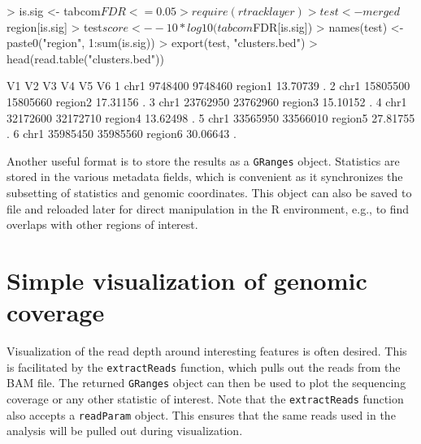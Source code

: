 \documentclass[12pt]{report}
\renewenvironment{Schunk}{\vspace{0pt}}{\vspace{0pt}}
\newcommand{\code}[1]{{\small\texttt{#1}}}
\begin{document}
\begin{Schunk}
\begin{Sinput}
> is.sig <- tabcom$FDR <= 0.05
> require(rtracklayer)
> test <- merged$region[is.sig]
> test$score <- -10*log10(tabcom$FDR[is.sig])
> names(test) <- paste0("region", 1:sum(is.sig))
> export(test, "clusters.bed")
> head(read.table("clusters.bed"))
\end{Sinput}
\begin{Soutput}
    V1       V2       V3      V4       V5 V6
1 chr1  9748400  9748460 region1 13.70739  .
2 chr1 15805500 15805660 region2 17.31156  .
3 chr1 23762950 23762960 region3 15.10152  .
4 chr1 32172600 32172710 region4 13.62498  .
5 chr1 33565950 33566010 region5 27.81755  .
6 chr1 35985450 35985560 region6 30.06643  .
\end{Soutput}
\end{Schunk}

Another useful format is to store the results as a \code{GRanges} object.
Statistics are stored in the various metadata fields, which is convenient as it synchronizes the subsetting of statistics and genomic coordinates.
This object can also be saved to file and reloaded later for direct manipulation in the R environment, e.g., to find overlaps with other regions of interest.

\begin{Schunk}
\end{Schunk}

\section{Simple visualization of genomic coverage}
Visualization of the read depth around interesting features is often desired.
This is facilitated by the \code{extractReads} function, which pulls out the reads from the BAM file.
The returned \code{GRanges} object can then be used to plot the sequencing coverage or any other statistic of interest.
Note that the \code{extractReads} function also accepts a \code{readParam} object.
This ensures that the same reads used in the analysis will be pulled out during visualization.
\end{document}
